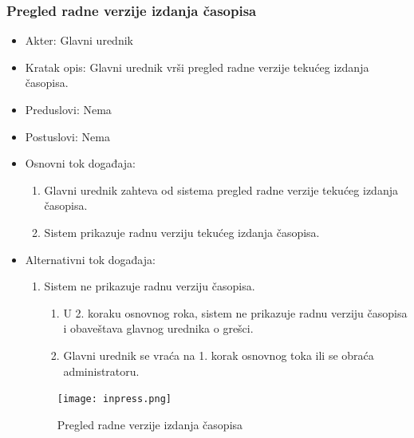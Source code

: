 \documentclass[a4paper]{article}
\begin{document}
\subsubsection{Pregled radne verzije izdanja časopisa}
\label{subsubsection:pregledradneverzije}
\begin{itemize}
    \item Akter: Glavni urednik
    \item Kratak opis: Glavni urednik vrši pregled radne verzije tekućeg izdanja časopisa.
    \item Preduslovi: Nema
    \item Postuslovi: Nema
    \item Osnovni tok događaja:
        \begin{enumerate}
            \item Glavni urednik zahteva od sistema pregled radne verzije tekućeg izdanja časopisa.
            \item Sistem prikazuje radnu verziju tekućeg izdanja časopisa.
        \end{enumerate}
    \item Alternativni tok događaja:
        \begin{enumerate}
            \item Sistem ne prikazuje radnu verziju časopisa.
            \begin{enumerate}
                \item U 2. koraku osnovnog roka, sistem ne prikazuje radnu verziju časopisa i obaveštava glavnog urednika o grešci.
                \item Glavni urednik se vraća na 1. korak osnovnog toka ili se obraća administratoru.
            \end{enumerate}
        \end{enumerate}
        \begin{figure}[hbt!]
    \centering
    \texttt{[image: inpress.png]}
    \caption{Pregled radne verzije izdanja časopisa \cite{vesnik}}
    \label{fig:inpress}
\end{figure}
\end{itemize}

\newpage
\end{document}
